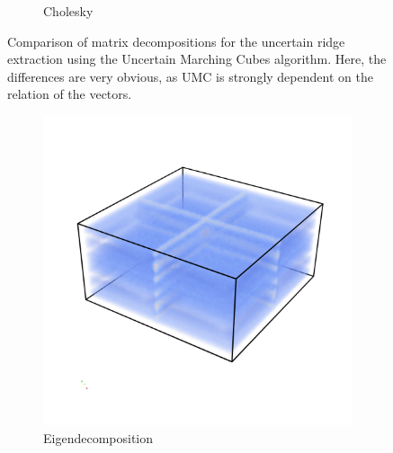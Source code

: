 \begin{figure}[t]
\begin{subfigure}[b]{0.49\textwidth}
        \caption{Cholesky}
        \label{fig:MCchol}
    \end{subfigure}
    \caption{Comparison of matrix decompositions for the uncertain
    ridge extraction using the Uncertain Marching Cubes algorithm. Here, the
    differences are very obvious, as UMC is strongly dependent on the relation
    of the vectors.}
    \label{fig:MCcomp}
\end{figure}

\begin{figure}
    \begin{subfigure}[b]{0.49\textwidth}
        \includegraphics[trim=0 350 0 300, clip=true, width=\textwidth]{Images/highuncEigen.png}
        \caption{Eigendecomposition}
        \label{fig:HUCeigen}
    \end{subfigure}
    \begin{subfigure}[b]{0.49\textwidth}

\end{subfigure}
\end{figure}
